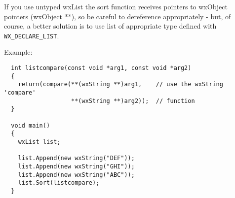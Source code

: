 If you use untyped wxList the sort function receives pointers to wxObject
pointers (wxObject **), so be careful to dereference appropriately - but,
of course, a better solution is to use list of appropriate type defined with
{\tt WX\_DECLARE\_LIST}.

Example:

\begin{verbatim}
  int listcompare(const void *arg1, const void *arg2)
  {
    return(compare(**(wxString **)arg1,    // use the wxString 'compare'
                   **(wxString **)arg2));  // function 
  }

  void main()
  {
    wxList list;

    list.Append(new wxString("DEF"));
    list.Append(new wxString("GHI"));
    list.Append(new wxString("ABC"));
    list.Sort(listcompare);
  }
\end{verbatim}

